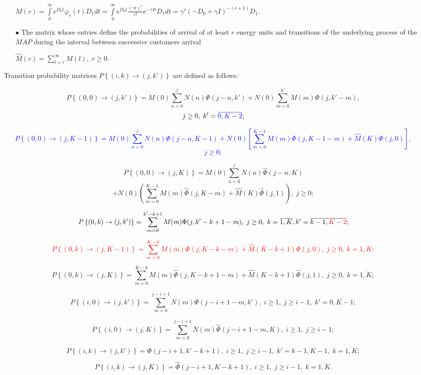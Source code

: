 \documentclass[runningheads]{llncs}
\begin{document}
\begin{itemize}
$ M(r) = \int\limits_{0}^{\infty} e^{D_{0}t}\varphi_{r}(t)D_{1}dt =
	\int\limits_{0}^{\infty} e^{D_{0}t}\frac{(\gamma t)^{r} }{r!} e^{-\gamma I t}D_{1}dt = \gamma^{r}(-D_{0} +  \gamma I)^{-(r+1)}D_{1}
$.

\item[$\bullet$]
The matrix whose entries  define the probabilities of arrival of at least $r$ energy units  and transitions of the underlying process  of the $MAP$ during  the interval between successive customers arrival


$ \hat M(r) = \sum\limits_{l=r}^{\infty} M(l),\; r \ge 0$.

\end{itemize}

\begin{lemma}
Transition probability matrices  $P\left\{(i,k) \to (j, k')\right\}$ are defined as follows:

$$P\left\{(0, 0) \to (j, k' ) \right\}=M(0)\sum\limits_{n = 0}^{j}N(n)\Phi(j-n, k') + N(0)\sum\limits_{m = 0}^{k'}M(m)\Phi(j, k' - m),$$
$$ j\geq 0,\; k'= \textcolor{blue}{\overline{0,K-2}};$$

\textcolor{blue}{
$$P\left\{(0, 0) \to (j,K-1 ) \right\}=M(0)\sum\limits_{n = 0}^{j}N(n)\Phi(j-n, K-1) + N(0)[\sum\limits_{m = 0}^{K-1}M(m)\Phi(j, K-1 - m)+\hat {M}(K) \Phi(j, 0)],
$$
$$ j\geq 0;$$
}

$$P\left\{(0, 0) \to (j, K) \right\}=M(0)\sum\limits_{n = 0}^{j}N(n)\hat\Phi(j-n, K) $$$$+ N(0)(\sum\limits_{m = 0}^{K-1}M(m)\hat\Phi(j, K - m) + \hat M(K)\hat \Phi(j, 1)),\;  j\geq 0;$$

$$P\left\{(0, k) \to (j, k') \right\}=\sum\limits_{m = 0}^{k'-k+1}M(m)\Phi(j,k' - k + 1 - m),\; j\geq 0,\; k=\overline{1,K}, k' =\overline{k-1, \textcolor{red}{K-2}};$$

\textcolor{red}{$$P\left\{(0, k) \to (j, K-1) \right\}=\sum\limits_{m = 0}^{K-k}M(m)\Phi(j,K-k - m)+
\hat{M}(K-k+1)\Phi(j,0),\; j\geq 0,\; k=\overline{1,K};
$$
 }

$$P\left\{(0, k) \to (j, K)\right\}=\sum\limits_{m = 0}^{K-k}M(m) \hat \Phi(j, K - k + 1 - m) + \hat M(K - k + 1)\hat \Phi(j, 1),\; j\geq 0,\; k =\overline{1,K};$$

$$P\left\{(i, 0) \to (j, k')  \right\}= \sum\limits_{m = 0}^{j - i + 1}N(m)\Phi(j - i + 1 - m, k'),\; i\geq 1,\; j \geq i-1,\; k' =\overline{0, K-1}; $$

$$P\left\{(i, 0) \to (j, K) \right\}=\sum\limits_{m = 0}^{j - i + 1}N(m)\hat \Phi(j - i + 1 - m, K),\; i \geq 1,\; j\geq i-1; $$

$$P\left\{(i, k) \to (j, k') \right\} =\Phi(j - i + 1, k' - k+1),\; i \geq 1,\; j\geq i-1,\; k' =\overline{k-1, K-1},\; k=\overline{1,K};$$

$$P\left\{(i, k) \to (j, K)\right\}= \hat \Phi(j - i + 1, K - k+1),\; i \geq 1,\; j\geq i-1,\; k=\overline{1,K}.$$
\end{lemma}
\end{document}
